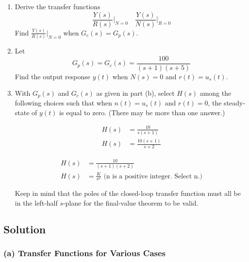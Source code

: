 \documentclass{article}
\begin{document}
\begin{enumerate}
    \item[a. ] Derive the transfer functions 
    \[
    \frac{Y(s)}{R(s)} \bigg|_{N=0}  \quad \frac{Y(s)}{N(s)} \bigg|_{R=0}
    \]
    Find \( \frac{Y(s)}{R(s)} \bigg|_{N=0} \) when \( G_c(s) = G_p(s) \).
    
    \item[b. ] Let
    \[
    G_p(s) = G_c(s) = \frac{100}{(s+1)(s+5)}
    \]
    Find the output response \( y(t) \) when \( N(s) = 0 \) and \( r(t) = u_s(t) \).

    \item[c. ] With \( G_p(s) \) and \( G_c(s) \) as given in part (b), select \( H(s) \) among the following choices such that when \( n(t) = u_s(t) \) and \( r(t) = 0 \), the steady-state of \( y(t) \) is equal to zero. (There may be more than one answer.)
\begin{center}
  \begin{minipage}{0.4\textwidth}
    \begin{align*}
      H(s) &= \frac{10}{s(s+1)} \\
      H(s) &= \frac{10(s+1)}{s+2}
    \end{align*}
  \end{minipage}
  \begin{minipage}{0.4\textwidth}
    \begin{align*}
      H(s) &= \frac{10}{(s+1)(s+2)} \\
      H(s) &= \frac{K}{s^n} \text{ (n is a positive integer. Select n.)}
    \end{align*}
  \end{minipage}
\end{center}

    
    
    Keep in mind that the poles of the closed-loop transfer function must all be in the left-half \( s \)-plane for the final-value theorem to be valid.
\end{enumerate}
\newline
\begin{figure}[htbp]
  \centering
  
\end{figure}
\subsection*{Solution}

\subsubsection*{(a) Transfer Functions for Various Cases}
\end{document}
